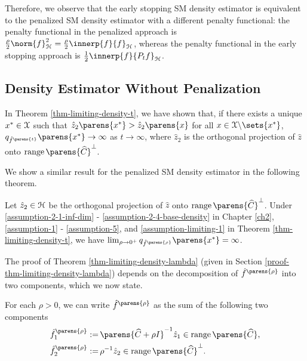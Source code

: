 Therefore, we observe that the early stopping SM density estimator is equivalent to the penalized SM density estimator with a different penalty functional: the penalty functional in the penalized approach is $\frac{\rho}{2} \norm{f}_{\calH}^2 = \frac{\rho}{2} \innerp{f}{f}_{\calH}$, whereas the penalty functional in the early stopping approach is $\frac{1}{2} \innerp{f}{P_t f}_{\calH}$. 


\subsection{Density Estimator Without Penalization}

In Theorem \ref{thm-limiting-density-t}, we have shown that, if there exists a unique $x^* \in \mathcal{X}$ such that $\hat{z}_2 \parens{x^*} > \hat{z}_2 \parens{x}$ for all $x \in \calX \backslash \sets{x^*}$, $q_{\hat{f}^{\parens{t}}} \parens{x^*} \to \infty$ as $t \to \infty$, where $\hat{z}_2$ is the orthogonal projection of $\hat{z}$ onto $\range \parens{\widehat{C}}^{\perp}$. 

We show a similar result for the penalized SM density estimator in the following theorem. 

\begin{theorem}\label{thm-limiting-density-lambda}
	Let $\hat{z}_2 \in \mathcal{H}$ be the orthogonal projection of $\hat{z}$ onto $\range \parens{\widehat{C}}^{\perp}$. Under \ref{assumption-2-1-inf-dim} - \ref{assumption-2-4-base-density} in Chapter \ref{ch2}, \ref{assumption-1} - \ref{assumption-5}, and \ref{assumption-limiting-1} in Theorem \ref{thm-limiting-density-t}, we have $\lim_{\rho \to 0^+} q_{\hat{f}^{\parens{\rho}}} \parens{x^*} = \infty$. 
\end{theorem}

The proof of Theorem \ref{thm-limiting-density-lambda} (given in Section \ref{proof-thm-limiting-density-lambda}) depends on the decomposition of $\hat{f}^{\parens{\rho}}$ into two components, which we now state. 

\begin{proposition}\label{prop-commutativity-Pi}
	For each $\rho > 0$, we can write $\hat{f}^{\parens{\rho}}$ as the sum of the following two components 
	\begin{align*}
		\hat{f}_{1}^{\parens{\rho}} := & \, \parens{\widehat{C} + \rho I}^{-1} \hat{z}_1 \in \range \parens{\widehat{C}}, %
		\\ 
		\hat{f}_{2}^{\parens{\rho}} := & \, \rho^{-1} \hat{z}_2 \in \range \parens{\widehat{C}}^{\perp}. %
	\end{align*}
\end{proposition}

